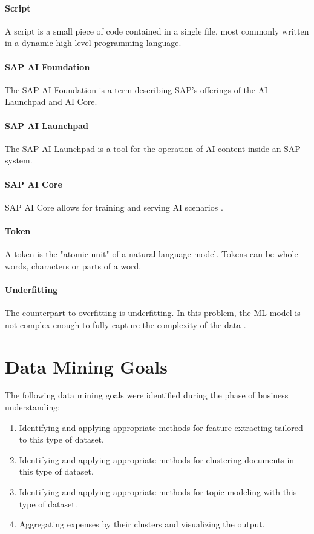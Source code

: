 	\paragraph{Script} A script is  a small piece of code contained in a single file, most commonly written in a dynamic high-level programming language.
	\paragraph{SAP AI Foundation} The SAP AI Foundation is a term describing SAP's offerings of the AI Launchpad and AI Core.
	\paragraph{SAP AI Launchpad} The SAP AI Launchpad is a tool for the operation of AI content inside an SAP system.
	\paragraph{SAP AI Core} SAP AI Core allows for training and serving AI scenarios \cite{schmitzLeonardo}.
	\paragraph{Token} A token is the "atomic unit" \cite{MLGlossary} of a natural language model. Tokens can be whole words, characters or parts of a word.
	\paragraph{Underfitting} The counterpart to overfitting is underfitting. In this problem, the \ac{ML} model is not complex enough to fully capture the complexity of the data \cite{MLGlossary}.


\section{Data Mining Goals}
\label{section:data-mining-goals}
The following data mining goals were identified during the phase of business understanding:

\begin{enumerate}
\item Identifying and applying appropriate methods for feature extracting tailored to this type of dataset.
\item Identifying and applying appropriate methods for clustering documents in this type of dataset.
\item Identifying and applying appropriate methods for topic modeling with this type of dataset.
\item Aggregating expenses by their clusters and visualizing the output.
\end{enumerate}

